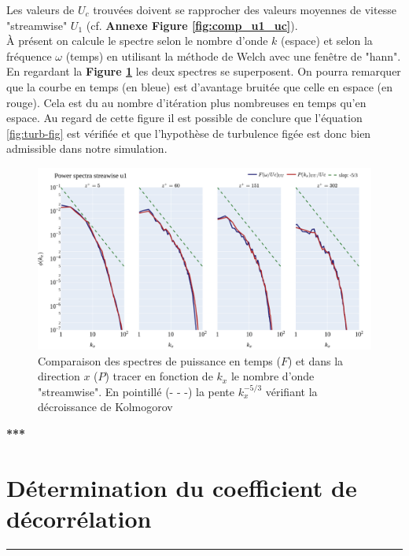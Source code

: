 \documentclass[12pt]{article}   %
\theoremstyle{plain}
\theoremstyle{remark}
\begin{document}
Les valeurs de $U_c$ trouvées doivent se rapprocher des valeurs moyennes de vitesse "streamwise" $U_1$ (cf. {\bf Annexe Figure \ref{fig:comp_u1_uc}}).\\

À présent on calcule le spectre selon le nombre d'onde $k$ (espace) et
selon la fréquence $\omega$ (temps) en utilisant la méthode de Welch \cite{welch1967spectra} avec une fenêtre de "hann". En regardant la {\bf Figure \ref{fig:spectra-space-time}} les deux spectres se superposent. On pourra remarquer que la courbe en temps (en bleue) est d'avantage bruitée que celle en espace (en rouge). Cela est du au nombre d'itération plus nombreuses en temps qu'en espace.
Au regard de cette figure il est possible de conclure que l'équation \ref{fig:turb-fig} est vérifiée et que l'hypothèse de turbulence figée est donc bien admissible dans notre simulation.

\begin{figure}[H]
	\begin{center}
		\includegraphics[width=0.85\linewidth]{../../output/figures/channel_wrles_retau395/split_time/frozen_turbulence/power_spectra/u1.png}
		\caption{Comparaison des spectres de puissance en temps ($F$) et dans la direction $x$ ($P$) tracer en fonction de $k_x$ le nombre d'onde "streamwise". En pointillé (- - -) la pente $k_x^{-5/3}$ vérifiant la décroissance de Kolmogorov \cite{kolmogorov1991local}}
		\label{fig:spectra-space-time}
	\end{center}
\end{figure}


\begin{center}
	\large \bf{***}
\end{center}

\vspace{0.3cm}
\section{Détermination du coefficient de décorrélation}
\noindent\rule{\linewidth}{2pt}
\vspace{0.1cm}
\end{document}
